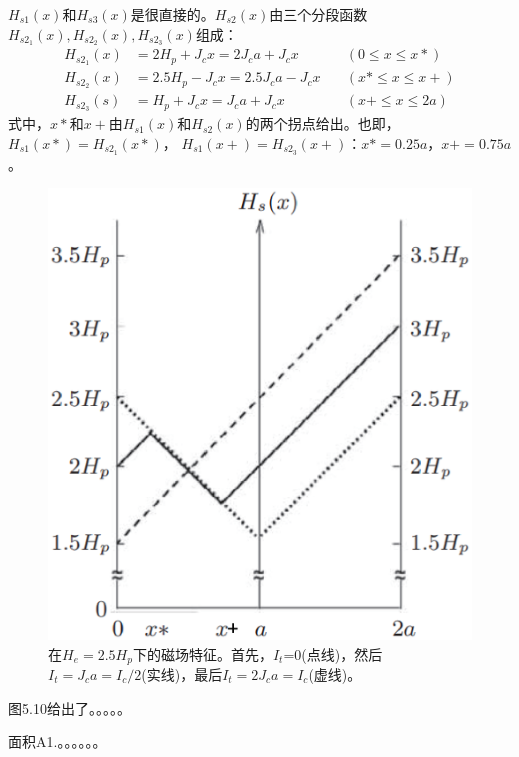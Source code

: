 $H_{s1}(x)$和$H_{s3}(x)$是很直接的。$H_{s2}(x)$由三个分段函数$H_{s2_1}(x),H_{s2_2}(x),H_{s2_3}(x)$组成：
\begin{align*}%
H_{s2_{1}}(x)&=2H_{p}+J_{c}x=2J_{c}a+J_{c}x\qquad&(0\leq x\leq x*)\\
H_{s2_{2}}(x)&=2.5H_{p}-J_{c}x=2.5J_{c}a-J_{c}x\quad&(x*\leq x\leq x+)\\
H_{s2_{3}}(s)&=H_{p}+J_{c}x=J_{c}a+J_{c}x\qquad&(x+\leq x\leq 2a)
\end{align*}
式中，$x*$和$x+$由$H_{s1}(x)$和$H_{s2}(x)$的两个拐点给出。也即，$H_{s1}(x*)=H_{s2_1}(x*)$，
$H_{s1}(x+)=H_{s2_3}(x+)$：$x*=0.25a$，$x+=0.75a$。
\begin{figure}[htbp]
	\centering
	\includegraphics[scale=0.6]{chpt5/figs/fig5.9.eps}
	\caption{在$H_e=2.5H_p$下的磁场特征。首先，$I_t$=0(点线)，然后$I_t=J_c a=I_c/2$(实线)，最后$I_t=2J_c a=I_c$(虚线)。}
\end{figure}

图5.10给出了。。。。。

面积A1.。。。。。。

